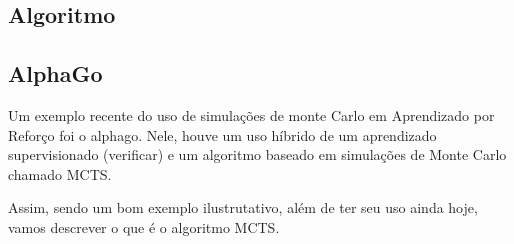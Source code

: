 \documentclass{article}
\begin{document}
        \subsection{Algoritmo}
        
        \subsection{AlphaGo}
        
            Um exemplo recente do uso de simulações de monte Carlo em Aprendizado por Reforço foi o alphago. Nele, houve um uso híbrido de um aprendizado supervisionado (verificar) e um algoritmo baseado em simulações de Monte Carlo chamado MCTS.

            Assim, sendo um bom exemplo ilustrutativo, além de ter seu uso ainda hoje, vamos descrever o que é o algoritmo MCTS.
\end{document}
